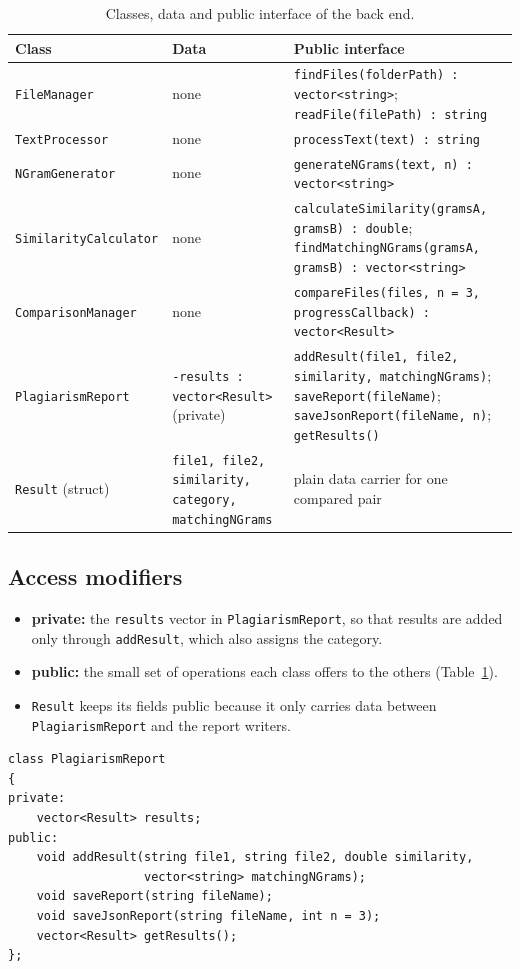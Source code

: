 \documentclass[11pt,a4paper]{report}
\newcommand{\cc}[1]{\texttt{#1}}
\begin{document}
\begin{table}[htbp]
\centering
\small
\begin{tabular}{@{}p{3.8cm} p{3.0cm} p{8.2cm}@{}}
\toprule
Class & Data & Public interface \\
\midrule
\cc{FileManager} & none &
  \cc{findFiles(folderPath) : vector<string>}; \cc{readFile(filePath) : string} \\
\cc{TextProcessor} & none & \cc{processText(text) : string} \\
\cc{NGramGenerator} & none & \cc{generateNGrams(text, n) : vector<string>} \\
\cc{SimilarityCalculator} & none &
  \cc{calculateSimilarity(gramsA, gramsB) : double}; \cc{findMatchingNGrams(gramsA,
  gramsB) : vector<string>} \\
\cc{ComparisonManager} & none &
  \cc{compareFiles(files, n = 3, progressCallback) : vector<Result>} \\
\cc{PlagiarismReport} & \cc{-results : vector<Result>} (private) &
  \cc{addResult(file1, file2, similarity, matchingNGrams)}; \cc{saveReport(fileName)};
  \cc{saveJsonReport(fileName, n)}; \cc{getResults()} \\
\cc{Result} (struct) & \cc{file1, file2, similarity, category, matchingNGrams} &
  plain data carrier for one compared pair \\
\bottomrule
\end{tabular}
\caption{Classes, data and public interface of the back end.}
\label{tab:classes}
\end{table}

\subsection{Access modifiers}
\begin{itemize}[nosep]
  \item \textbf{private:} the \cc{results} vector in \cc{PlagiarismReport}, so that results
        are added only through \cc{addResult}, which also assigns the category.
  \item \textbf{public:} the small set of operations each class offers to the others
        (Table~\ref{tab:classes}).
  \item \cc{Result} keeps its fields public because it only carries data between
        \cc{PlagiarismReport} and the report writers.
\end{itemize}

\begin{lstlisting}[caption={Encapsulation: the results can only be changed through \texttt{addResult}, which assigns the category.}]
class PlagiarismReport
{
private:
    vector<Result> results;
public:
    void addResult(string file1, string file2, double similarity,
                   vector<string> matchingNGrams);
    void saveReport(string fileName);
    void saveJsonReport(string fileName, int n = 3);
    vector<Result> getResults();
};
\end{lstlisting}
\end{document}
